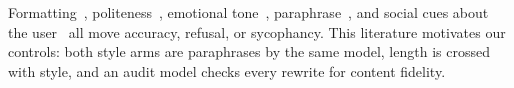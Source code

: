 Formatting~\citep{sclar2023sensitivity}, politeness~\citep{yin2024respect}, emotional tone~\citep{patel2026emotional}, paraphrase~\citep{plaza2025persona}, and social cues about the user~\citep{huang2026syps,cheng2026verbalizing} all move accuracy, refusal, or sycophancy.
This literature motivates our controls: both style arms are paraphrases by the same model, length is crossed with style, and an audit model checks every rewrite for content fidelity.
